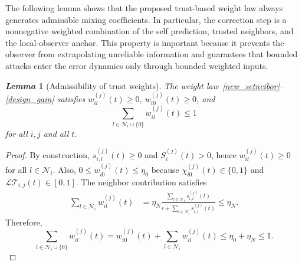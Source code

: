 \documentclass[journal,twoside]{IEEEtran}
\def\N{\mathcal{N}} %
\def\LT{\mathcal{LT}} %
\newtheorem{lemma}{\it Lemma}%
\begin{document}
The following lemma shows that the proposed trust-based weight law always
generates admissible mixing coefficients. In particular, the correction step
is a nonnegative weighted combination of the self prediction, trusted neighbors,
and the local-observer anchor. This property is important because it prevents
the observer from extrapolating unreliable information and guarantees that
bounded attacks enter the error dynamics only through bounded weighted inputs.

\begin{lemma}[Admissibility of trust weights]\label{lem_weight_admissible}
The weight law~\eqref{new_setneibor}--\eqref{design_gain} satisfies $w_{il}^{(j)}(t)\ge0$, $w_{i0}^{(j)}(t)\ge0$, and
\begin{equation}
\sum_{l\in\N_i\cup\{0\}}w_{il}^{(j)}(t)\le1
\end{equation}
for all $i,j$ and all $t$.
\end{lemma}
\begin{proof}
By construction, $s_{i,l}^{(j)}(t)\ge0$ and $S_i^{(j)}(t)>0$, hence $w_{il}^{(j)}(t)\ge0$ for all $l\in\N_i$. Also, $0\le w_{i0}^{(j)}(t)\le \eta_0$ because $\chi_{i0}^{(j)}(t)\in\{0,1\}$ and $\LT_{i,j}(t)\in[0,1]$. The neighbor contribution satisfies
\begin{align*}
\sum_{l\in\N_i}w_{il}^{(j)}(t)
&=
\eta_N
\frac{\sum_{l\in\N_i}s_{i,l}^{(j)}(t)}
{\epsilon+\sum_{l\in\N_i}s_{i,l}^{(j)}(t)}
\le \eta_N .
\end{align*}
Therefore,
\[
\sum_{l\in\N_i\cup\{0\}}w_{il}^{(j)}(t)
=w_{i0}^{(j)}(t)+\sum_{l\in\N_i}w_{il}^{(j)}(t)
\le \eta_0+\eta_N\le1 .
\]
\end{proof}
\end{document}
